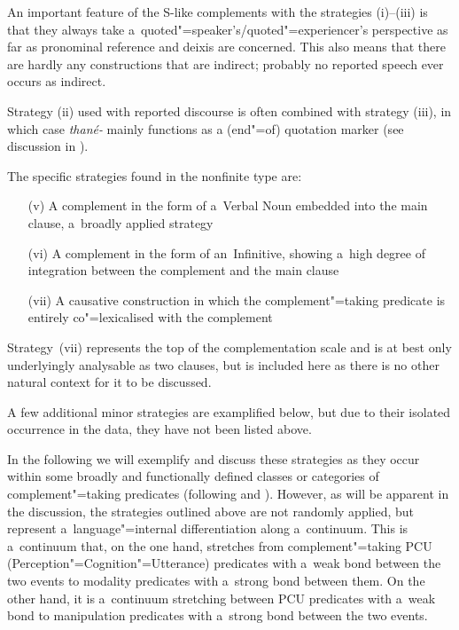 An important feature of the S-like complements with the strategies (i)--(iii) is that they always take a~quoted"=speaker's/quoted"=experiencer's perspective as far as pronominal reference and deixis are concerned. This also means that there are hardly any constructions that are indirect; probably no reported speech ever occurs as indirect.


Strategy (ii) used with reported discourse is often combined with strategy (iii), in which case \textit{thané-} mainly functions as a (end"=of) quotation marker (see discussion in ).


The specific strategies found in the nonfinite type are:

\begin{enumerate}
\item[(v)] A complement in the form of a~Verbal Noun embedded into the main clause, a~broadly applied strategy
\item[(vi)] A complement in the form of an~Infinitive, showing a~high degree of integration between the complement and the main clause
\item[(vii)] A causative construction in which the complement"=taking predicate is entirely co"=lexicalised with the complement
\end{enumerate}
Strategy~(vii) represents the top of the complementation scale \citep[74]{givon2001b} and is at best only underlyingly analysable as two clauses, but is included here as there is no other natural context for it to be discussed.


A few additional minor strategies are examplified below, but due to their isolated occurrence in the data, they have not been listed above.



In the following we will exemplify and discuss these strategies as they occur within some broadly and functionally defined classes or categories of complement"=taking predicates (following \citealt[40--59]{givon2001b} and \citealt[110-33]{noonan1985}). However, as will be apparent in the discussion, the strategies outlined above are not randomly applied, but represent a~language"=internal differentiation along a~continuum. This is a~continuum that, on the one hand, stretches from complement"=taking PCU (Perception"=Cognition"=Utterance) predicates with a~weak bond between the two events to modality predicates with a~strong bond between them. On the other hand, it is a~continuum stretching between PCU predicates with a~weak bond to manipulation predicates with a~strong bond between the two events.


